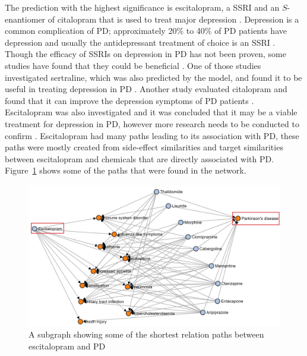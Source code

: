 The prediction with the highest significance is escitalopram, a \ac{SSRI} and an $S$-enantiomer of citalopram that is used to treat major depression \cite{weintraub_escitalopram_2006}.
Depression is a common complication of \ac{PD}; approximately 20\% to 40\% of \ac{PD} patients have depression and usually the antidepressant treatment of choice is an \ac{SSRI} \cite{weintraub_escitalopram_2006}.
Though the efficacy of \ac{SSRI}s on depression in \ac{PD} has not been proven, some studies have found that they could be beneficial \cite{rampello_ssri_2002, hauser_sertraline_1997, ceravolo_paroxetine_2000, menza_citalopram_2004}.
One of those studies investigated sertraline, which was also predicted by the model, and found it to be useful in treating depression in \ac{PD} \cite{hauser_sertraline_1997}.
Another study evaluated citalopram and found that it can improve the depression symptoms of PD patients \cite{menza_citalopram_2004}.
Escitalopram was also investigated and it was concluded that it may be a viable treatment for depression in PD, however more research needs to be conducted to confirm \cite{weintraub_escitalopram_2006, verma_efficacy_2012}.
Escitalopram had many paths leading to its association with \ac{PD}, these paths were mostly created from side-effect similarities and target similarities between escitalopram and chemicals that are directly associated with \ac{PD}.
Figure~\ref{fig:parkinson_escitalopram} shows some of the paths that were found in the network.

\begin{figure}[h!]
    \centering
    \includegraphics[scale=0.6]
    {figures/parkinson_escitalopram.jpg}
    \caption [Escitalopram-PD path subgraph]{\label{fig:parkinson_escitalopram} A subgraph showing some of the shortest relation paths between escitalopram and \ac{PD}}
\end{figure}

